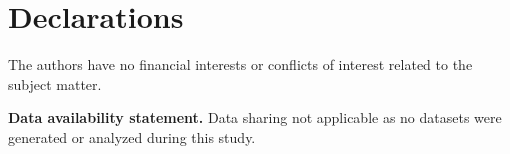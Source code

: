\documentclass[11pt]{amsart}
\theoremstyle{definition}
\theoremstyle{remark}
\numberwithin{equation}{section}
\begin{document}
\section*{Declarations}
\footnotesize{
%
 The authors have no financial interests or conflicts of interest related to the subject matter.
\smallskip

\noindent \textbf{Data availability statement.} Data sharing not applicable as no datasets were generated or analyzed during this study.}


\end{document}
